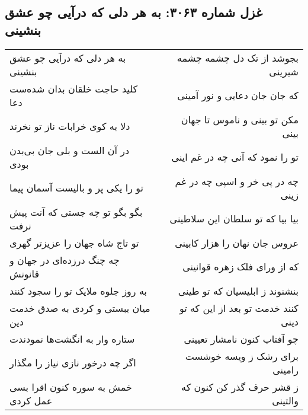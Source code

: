 \begin{center}
\section*{غزل شماره ۳۰۶۳: به هر دلی که درآیی چو عشق بنشینی}
\label{sec:3063}
\begin{longtable}{l p{0.5cm} r}
به هر دلی که درآیی چو عشق بنشینی
&&
بجوشد از تک دل چشمه چشمه شیرینی
\\
کلید حاجت خلقان بدان شده‌ست دعا
&&
که جان جان دعایی و نور آمینی
\\
دلا به کوی خرابات ناز تو نخرند
&&
مکن تو بینی و ناموس تا جهان بینی
\\
در آن الست و بلی جان بی‌بدن بودی
&&
تو را نمود که آنی چه در غم اینی
\\
تو را یکی پر و بالیست آسمان پیما
&&
چه در پی خر و اسپی چه در غم زینی
\\
بگو بگو تو چه جستی که آنت پیش نرفت
&&
بیا بیا که تو سلطان این سلاطینی
\\
تو تاج شاه جهان را عزیزتر گهری
&&
عروس جان نهان را هزار کابینی
\\
چه چنگ درزده‌ای در جهان و قانونش
&&
که از ورای فلک زهره قوانینی
\\
به روز جلوه ملایک تو را سجود کنند
&&
بنشنوند ز ابلیسیان که تو طینی
\\
میان ببستی و کردی به صدق خدمت دین
&&
کنند خدمت تو بعد از این که تو دینی
\\
ستاره وار به انگشت‌ها نمودندت
&&
چو آفتاب کنون نامشار تعیینی
\\
اگر چه درخور نازی نیاز را مگذار
&&
برای رشک ز ویسه خوشست رامینی
\\
خمش به سوره کنون اقرا بسی عمل کردی
&&
ز قشر حرف گذر کن کنون که والتینی
\\
\end{longtable}
\end{center}

